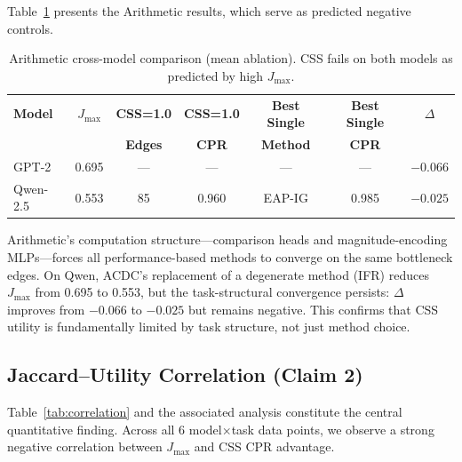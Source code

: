 \documentclass[11pt]{article}
\newcommand{\css}{\textsc{CSS}}
\begin{document}
Table~\ref{tab:arithmetic} presents the Arithmetic results, which serve as predicted negative controls.

\begin{table}[t]
\centering
\caption{Arithmetic cross-model comparison (mean ablation). CSS fails on both models as predicted by high $J_{\max}$.}
\label{tab:arithmetic}
\small
\begin{tabular}{lcccccc}
\toprule
\textbf{Model} & \textbf{$J_{\max}$} & \textbf{CSS=1.0} & \textbf{CSS=1.0} & \textbf{Best Single} & \textbf{Best Single} & \textbf{$\Delta$} \\
 & & \textbf{Edges} & \textbf{CPR} & \textbf{Method} & \textbf{CPR} & \\
\midrule
GPT-2 & 0.695 & --- & --- & --- & --- & $-0.066$ \\
Qwen-2.5 & 0.553 & 85 & 0.960 & EAP-IG & 0.985 & $-0.025$ \\
\bottomrule
\end{tabular}
\end{table}

Arithmetic's computation structure---comparison heads and magnitude-encoding MLPs---forces all performance-based methods to converge on the same bottleneck edges. On Qwen, ACDC's replacement of a degenerate method (IFR) reduces $J_{\max}$ from 0.695 to 0.553, but the task-structural convergence persists: $\Delta$ improves from $-0.066$ to $-0.025$ but remains negative. This confirms that \css{} utility is fundamentally limited by task structure, not just method choice.

\subsection{Jaccard--Utility Correlation (Claim 2)}
\label{sec:correlation}

Table~\ref{tab:correlation} and the associated analysis constitute the central quantitative finding. Across all 6 model$\times$task data points, we observe a strong negative correlation between $J_{\max}$ and \css{} CPR advantage.
\end{document}
